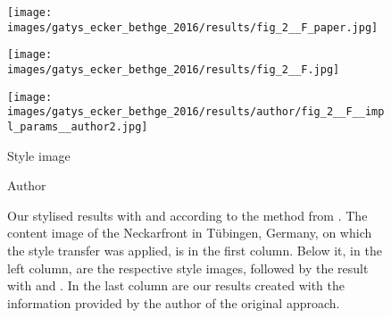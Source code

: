 \begin{figure}[H]
\begin{minipage}[t]{0.24\textwidth}
	\end{minipage}
	\hfill%
	\begin{minipage}[t]{0.24\textwidth}
		\centering
		\texttt{[image: images/gatys\_ecker\_bethge\_2016/results/fig\_2\_\_F\_paper.jpg]}
	\end{minipage}
	\hfill%
	\begin{minipage}[t]{0.24\textwidth}
		\centering
		\texttt{[image: images/gatys\_ecker\_bethge\_2016/results/fig\_2\_\_F.jpg]}
	\end{minipage}
	\hfill%
	\begin{minipage}[t]{0.24\textwidth}
		\centering
		\texttt{[image: images/gatys\_ecker\_bethge\_2016/results/author/fig\_2\_\_F\_\_impl\_params\_\_author2.jpg]}
	\end{minipage}
	\hfill%
	\begin{minipage}[t]{0.24\textwidth}
		\centering
		Style image
	\end{minipage}
	\hfill%
	\begin{minipage}[t]{0.24\textwidth}
		\centering
		\paper{}
	\end{minipage}
	\hfill%
	\begin{minipage}[t]{0.24\textwidth}
		\centering
		\implementation{}
	\end{minipage}
	\hfill%
	\begin{minipage}[t]{0.24\textwidth}
		\centering
		Author
	\end{minipage}
	\caption{Our stylised results with \paper{} and \implementation{} according to the method from \cite{GEB2016}. The content image of the Neckarfront in Tübingen, Germany, on which the style transfer was applied, is in the first column. Below it, in the left column, are the respective style images, followed by the result with \paper{} and \implementation{}. In the last column are our results created with the information provided by the author of the original approach.}
	\label{fig:GEB2016_fig_2}
\end{figure}



